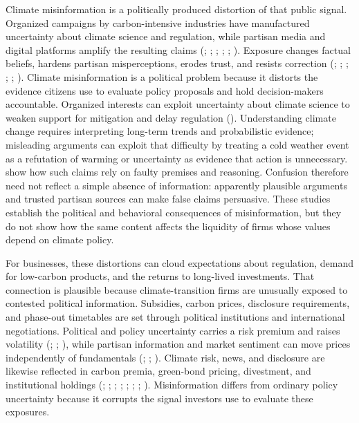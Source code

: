 \documentclass{article}
\theoremstyle{plain}
\begin{document}
Climate misinformation is a politically produced distortion of that public signal. Organized campaigns by carbon-intensive industries have manufactured uncertainty about climate science and regulation, while partisan media and digital platforms amplify the resulting claims (\cite{oreskes2010merchants}; \cite{farrell2015corporate}; \cite{farrell2016network}; \cite{SupranRahmstorfOreskes2023}; \cite{VosoughiRoyAral2018}; \cite{acemoglu2010spread}). Exposure changes factual beliefs, hardens partisan misperceptions, erodes trust, and resists correction (\cite{flynn2017misperceptions}; \cite{NyhanReifler2010}; \cite{lewandowsky2017beyond}; \cite{bursztyn2020misinformation}; \cite{lazer2018science}; \cite{cobb2025politics}). Climate misinformation is a political problem because it distorts the evidence citizens use to evaluate policy proposals and hold decision-makers accountable. Organized interests can exploit uncertainty about climate science to weaken support for mitigation and delay regulation (\cite{farrell2019misinfo}). Understanding climate change requires interpreting long-term trends and probabilistic evidence; misleading arguments can exploit that difficulty by treating a cold weather event as a refutation of warming or uncertainty as evidence that action is unnecessary. \textcite{CookEllertonKinkead2018} show how such claims rely on faulty premises and reasoning. Confusion therefore need not reflect a simple absence of information: apparently plausible arguments and trusted partisan sources can make false claims persuasive. These studies establish the political and behavioral consequences of misinformation, but they do not show how the same content affects the liquidity of firms whose values depend on climate policy.

For businesses, these distortions can cloud expectations about regulation, demand for low-carbon products, and the returns to long-lived investments. That connection is plausible because climate-transition firms are unusually exposed to contested political information. Subsidies, carbon prices, disclosure requirements, and phase-out timetables are set through political institutions and international negotiations. Political and policy uncertainty carries a risk premium and raises volatility (\cite{PastorVeronesi2012}; \cite{PastorVeronesi2013}; \cite{BakerBloomDavis2016}), while partisan information and market sentiment can move prices independently of fundamentals (\cite{AZZIMONTI2023}; \cite{lei2023political}; \cite{DeLongShleiferSummersWaldmann1990}). Climate risk, news, and disclosure are likewise reflected in carbon premia, green-bond pricing, divestment, and institutional holdings (\cite{engle2020hedging}; \cite{bolton2021climate}; \cite{HongLiXu2019}; \cite{pankratz2023climate}; \cite{KruegerSautnerTangZhong2024}; \cite{flammer2021corporate}; \cite{FriedeBuschBassen2015}; \cite{Drahos_2025}). Misinformation differs from ordinary policy uncertainty because it corrupts the signal investors use to evaluate these exposures.
\end{document}
